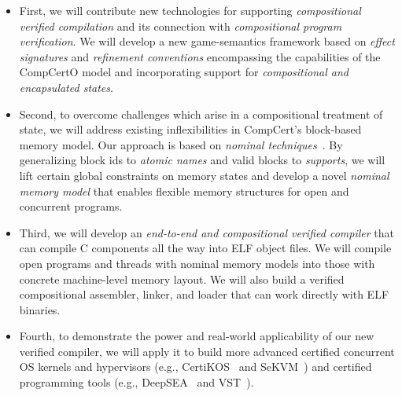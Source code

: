 \begin{itemize} \itemsep 0pt
\item First, we will contribute new technologies for supporting {\em
  compositional verified compilation} and its connection with {\em
  compositional program verification}. 
  We will develop a new game-semantics framework
  based on {\em effect signatures} and {\em refinement conventions}
  encompassing the capabilities of the CompCertO model
  and incorporating support for {\em compositional and encapsulated states}.
\item Second, to overcome challenges which arise
  in a compositional treatment of state,
  we will address existing inflexibilities
  in CompCert's block-based memory model.
  Our approach is based on \emph{nominal
  techniques}~\cite{pitts-nominal,gabby2002}. By generalizing block
  ids to {\em atomic names} and valid blocks to {\em supports},
  we will lift certain global constraints on memory states and develop a
  novel {\em nominal memory model} that enables flexible memory
  structures for open and concurrent programs.
\item Third, we will develop an {\em end-to-end and compositional
  verified compiler} that can compile C components all the way into
  ELF object files. We will compile open programs and threads with
  nominal memory models into those with concrete machine-level memory
  layout. We will also build a verified compositional assembler,
  linker, and loader that can work directly with ELF binaries.
\item Fourth, to demonstrate the power and real-world applicability of
  our new verified compiler, we will apply it to build more advanced
  certified concurrent OS kernels and hypervisors (e.g., CertiKOS~\cite{certikos-osdi16}
  and SeKVM~\cite{sekvm21a,sekvm21b,tao21}) and certified programming tools
    (e.g., DeepSEA~\cite{deepsea19} and VST~\cite{appel11:vst}).
\end{itemize}
